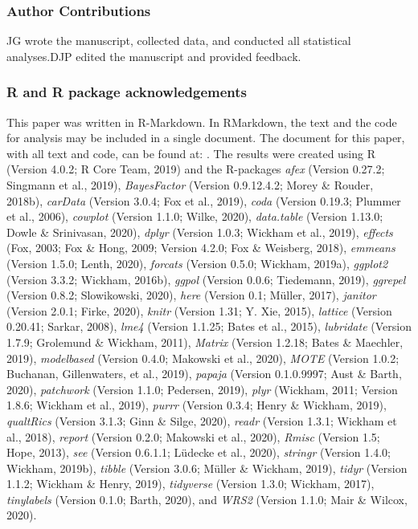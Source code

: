 \documentclass[
  english,
  jou]{apa7}
\begin{document}
\hypertarget{author-contributions}{%
\subsubsection{Author Contributions}\label{author-contributions}}

JG wrote the manuscript, collected data, and conducted all statistical analyses.DJP edited the manuscript and provided feedback.
\newline

\hypertarget{r-and-r-package-acknowledgements}{%
\subsubsection{R and R package acknowledgements}\label{r-and-r-package-acknowledgements}}

This paper was written in R-Markdown. In RMarkdown, the text and the code for analysis may
be included in a single document. The document for this paper, with all text and code, can be found at: . The results were created using R (Version 4.0.2; R Core Team, 2019) and the R-packages \emph{afex} (Version 0.27.2; Singmann et al., 2019), \emph{BayesFactor} (Version 0.9.12.4.2; Morey \& Rouder, 2018b), \emph{carData} (Version 3.0.4; Fox et al., 2019), \emph{coda} (Version 0.19.3; Plummer et al., 2006), \emph{cowplot} (Version 1.1.0; Wilke, 2020), \emph{data.table} (Version 1.13.0; Dowle \& Srinivasan, 2020), \emph{dplyr} (Version 1.0.3; Wickham et al., 2019), \emph{effects} (Fox, 2003; Fox \& Hong, 2009; Version 4.2.0; Fox \& Weisberg, 2018), \emph{emmeans} (Version 1.5.0; Lenth, 2020), \emph{forcats} (Version 0.5.0; Wickham, 2019a), \emph{ggplot2} (Version 3.3.2; Wickham, 2016b), \emph{ggpol} (Version 0.0.6; Tiedemann, 2019), \emph{ggrepel} (Version 0.8.2; Slowikowski, 2020), \emph{here} (Version 0.1; Müller, 2017), \emph{janitor} (Version 2.0.1; Firke, 2020), \emph{knitr} (Version 1.31; Y. Xie, 2015), \emph{lattice} (Version 0.20.41; Sarkar, 2008), \emph{lme4} (Version 1.1.25; Bates et al., 2015), \emph{lubridate} (Version 1.7.9; Grolemund \& Wickham, 2011), \emph{Matrix} (Version 1.2.18; Bates \& Maechler, 2019), \emph{modelbased} (Version 0.4.0; Makowski et al., 2020), \emph{MOTE} (Version 1.0.2; Buchanan, Gillenwaters, et al., 2019), \emph{papaja} (Version 0.1.0.9997; Aust \& Barth, 2020), \emph{patchwork} (Version 1.1.0; Pedersen, 2019), \emph{plyr} (Wickham, 2011; Version 1.8.6; Wickham et al., 2019), \emph{purrr} (Version 0.3.4; Henry \& Wickham, 2019), \emph{qualtRics} (Version 3.1.3; Ginn \& Silge, 2020), \emph{readr} (Version 1.3.1; Wickham et al., 2018), \emph{report} (Version 0.2.0; Makowski et al., 2020), \emph{Rmisc} (Version 1.5; Hope, 2013), \emph{see} (Version 0.6.1.1; Lüdecke et al., 2020), \emph{stringr} (Version 1.4.0; Wickham, 2019b), \emph{tibble} (Version 3.0.6; Müller \& Wickham, 2019), \emph{tidyr} (Version 1.1.2; Wickham \& Henry, 2019), \emph{tidyverse} (Version 1.3.0; Wickham, 2017), \emph{tinylabels} (Version 0.1.0; Barth, 2020), and \emph{WRS2} (Version 1.1.0; Mair \& Wilcox, 2020).
\end{document}
